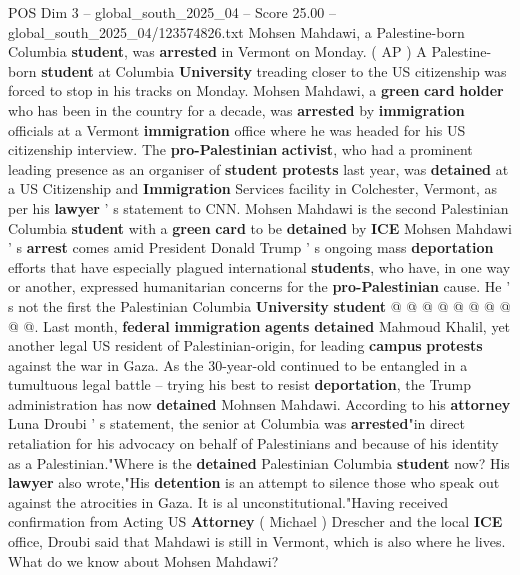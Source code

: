 \begin{textsample}{POS Dim 3 – global\_south\_2025\_04 – Score 25.00 – global\_south\_2025\_04/123574826.txt}  \label{ex:f3_pos_114}
Mohsen Mahdawi, a Palestine-born Columbia \textbf{student}, was \textbf{arrested} in Vermont on Monday. ( AP ) A Palestine-born \textbf{student} at Columbia \textbf{University} treading closer to the US citizenship was forced to stop in his tracks on Monday.
Mohsen Mahdawi, a \textbf{green} \textbf{card} \textbf{holder} who has been in the country for a decade, was \textbf{arrested} by \textbf{immigration} officials at a Vermont \textbf{immigration} office where he was headed for his US citizenship interview.
The \textbf{pro-Palestinian} \textbf{activist}, who had a prominent leading presence as an organiser of \textbf{student} \textbf{protests} last year, was \textbf{detained} at a US Citizenship and \textbf{Immigration} Services facility in Colchester, Vermont, as per his \textbf{lawyer} ' s statement to CNN.
Mohsen Mahdawi is the second Palestinian Columbia \textbf{student} with a \textbf{green} \textbf{card} to be \textbf{detained} by \textbf{ICE} Mohsen Mahdawi ' s \textbf{arrest} comes amid President Donald Trump ' s ongoing mass \textbf{deportation} efforts that have especially plagued international \textbf{students}, who have, in one way or another, expressed humanitarian concerns for the \textbf{pro-Palestinian} cause.
He ' s not the first the Palestinian Columbia \textbf{University} \textbf{student} @ @ @ @ @ @ @ @ @ @.
Last month, \textbf{federal} \textbf{immigration} \textbf{agents} \textbf{detained} Mahmoud Khalil, yet another legal US resident of Palestinian-origin, for leading \textbf{campus} \textbf{protests} against the war in Gaza.
As the 30-year-old continued to be entangled in a tumultuous legal battle -- trying his best to resist \textbf{deportation}, the Trump administration has now \textbf{detained} Mohnsen Mahdawi.
According to his \textbf{attorney} Luna Droubi ' s statement, the senior at Columbia was \textbf{arrested}"in direct retaliation for his advocacy on behalf of Palestinians and because of his identity as a Palestinian."Where is the \textbf{detained} Palestinian Columbia \textbf{student} now?
His \textbf{lawyer} also wrote,"His \textbf{detention} is an attempt to silence those who speak out against the atrocities in Gaza.
It is al unconstitutional."Having received confirmation from Acting US \textbf{Attorney} ( Michael ) Drescher and the local \textbf{ICE} office, Droubi said that Mahdawi is still in Vermont, which is also where he lives.
What do we know about Mohsen Mahdawi?

\end{textsample}
